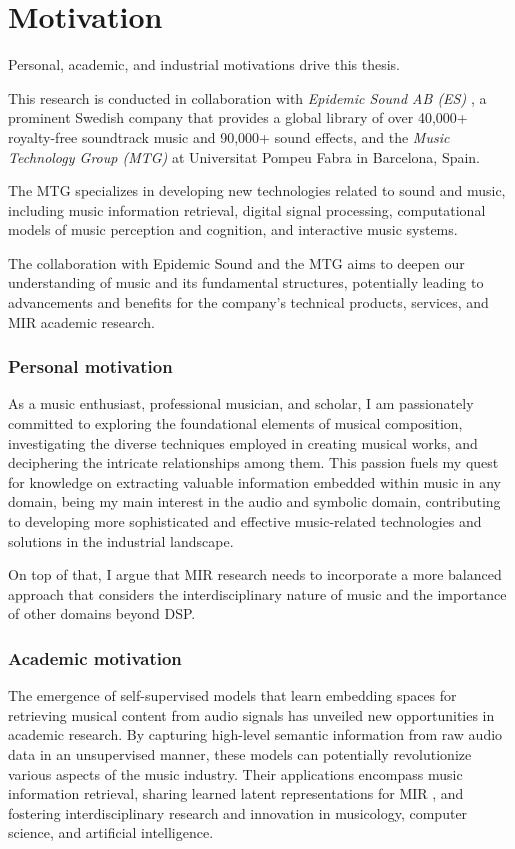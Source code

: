 \section{Motivation}

Personal, academic, and industrial motivations drive this thesis. 

This research is conducted in collaboration with \textit{Epidemic Sound AB (ES)} \cite{EpidemicSite}, a prominent Swedish company that provides a global library of over 40,000+ royalty-free soundtrack music and 90,000+ sound effects, and the \textit{Music Technology Group (MTG)} at Universitat Pompeu Fabra in Barcelona, Spain. 

The MTG specializes in developing new technologies related to sound and music, including music information retrieval, digital signal processing, computational models of music perception and cognition, and interactive music systems. 

The collaboration with Epidemic Sound and the MTG aims to deepen our understanding of music and its fundamental structures, potentially leading to advancements and benefits for the company's technical products, services, and MIR academic research.

\subsubsection{Personal motivation}

As a music enthusiast, professional musician, and scholar, I am passionately committed to exploring the foundational elements of musical composition, investigating the diverse techniques employed in creating musical works, and deciphering the intricate relationships among them. This passion fuels my quest for knowledge on extracting valuable information embedded within music in any domain, being my main interest in the audio and symbolic domain, contributing to developing more sophisticated and effective music-related technologies and solutions in the industrial landscape.

On top of that, I argue that MIR research needs to incorporate a more balanced approach that considers the interdisciplinary nature of music and the importance of other domains beyond DSP.

\subsubsection{Academic motivation}

The emergence of self-supervised models that learn embedding spaces for retrieving musical content from audio signals has unveiled new opportunities in academic research. By capturing high-level semantic information from raw audio data in an unsupervised manner, these models can potentially revolutionize various aspects of the music industry. Their applications encompass music information retrieval, sharing learned latent representations for MIR \cite{HamelTransferSimilarity}, and fostering interdisciplinary research and innovation in musicology, computer science, and artificial intelligence.

